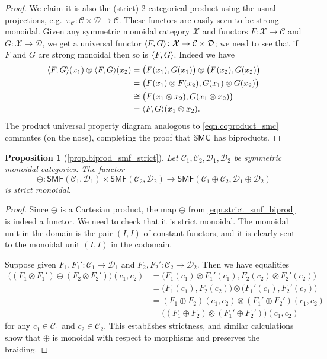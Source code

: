 \documentclass[11pt, oneside, article]{memoir}
\theoremstyle{plain}
\newtheorem*{proposition*}{Proposition}
\theoremstyle{definition}
\theoremstyle{remark}
\newcommand{\cat}[1]{\mathcal{#1}}%
\newcommand{\Cat}[1]{{\mathsf{#1}}}%
\newcommand{\CCat}[1]{\mathbb{\StrLeft{#1}{1}}\Cat{\StrGobbleLeft{#1}{1}}}%
\DeclarePairedDelimiter{\pair}{\langle}{\rangle}
\newcommand{\smf}{\Cat{SMF}}
\newcommand{\ssmc}{\CCat{SMC}}
\begin{document}
\begin{proof}
We claim it is also the (strict) 2-categorical product using the usual projections, e.g.\ $\pi_{\cat{C}}\colon\cat{C}\times\cat{D}\to\cat{C}$. These functors are easily seen to be strong monoidal. Given any symmetric monoidal category $\cat{X}$ and functors $F\colon\cat{X}\to\cat{C}$ and $G\colon\cat{X}\to\cat{D}$, we get a universal functor $\pair{F,G}\colon\cat{X}\to\cat{C}\times\cat{D}$; we need to see that if $F$ and $G$ are strong monoidal then so is $\pair{F,G}$. Indeed we have
\begin{align*}
	\pair{F,G}(x_1)\otimes\pair{F,G}(x_2)&=
	\big(F(x_1),G(x_1)\big)\otimes\big(F(x_2),G(x_2)\big)\\&=
	\big(F(x_1)\otimes F(x_2),G(x_1)\otimes G(x_2)\big)\\&\cong
	\big(F(x_1\otimes x_2),G(x_1\otimes x_2)\big)\\&=
	\pair{F,G}(x_1\otimes x_2).
\end{align*}
The product universal property diagram analogous to \cref{eqn.coproduct_smc} commutes (on the nose), completing the proof that $\ssmc$ has biproducts.
\end{proof}

\begin{proposition*}[\ref{prop.biprod_smf_strict}]\label{page.biprod_smf_strict}
Let $\cat{C}_1,\cat{C}_2,\cat{D}_1,\cat{D}_2$ be symmetric monoidal categories. The functor
\begin{equation}\label{eqn.strict_smf_biprod}\oplus\colon\smf(\cat{C}_1,\cat{D}_1)\times\smf(\cat{C}_2,\cat{D}_2)\to\smf(\cat{C}_1\oplus\cat{C}_2,\cat{D}_1\oplus\cat{D}_2)
\end{equation}
is strict monoidal.
\end{proposition*}
\begin{proof}
Since $\oplus$ is a Cartesian product, the map $\oplus$ from \cref{eqn.strict_smf_biprod} is indeed a functor. We need to check that it is strict monoidal. The monoidal unit in the domain is the pair $(I,I)$ of constant functors, and it is clearly sent to the monoidal unit $(I,I)$ in the codomain.

Suppose given $F_1, F_1'\colon\cat{C}_1\to\cat{D}_1$ and $F_2,F_2'\colon\cat{C}_2\to\cat{D}_2$. Then we have equalities
\begin{align*}
	\big((F_1\otimes F_1')\oplus(F_2\otimes F_2')\big)(c_1,c_2)&=
	\big(F_1(c_1)\otimes F_1'(c_1),F_2(c_2)\otimes F_2'(c_2)\big)\\&=
	\big(F_1(c_1),F_2(c_2)\big)\otimes\big(F_1'(c_1),F_2'(c_2)\big)\\&=
	(F_1\oplus F_2)(c_1,c_2)\otimes(F_1'\oplus F_2')(c_1,c_2)\\&=
	\big((F_1\oplus F_2)\otimes(F_1'\oplus F_2')\big)(c_1,c_2)
\end{align*}
for any $c_1\in\cat{C}_1$ and $c_2\in\cat{C}_2$. This establishes strictness, and similar calculations show that $\oplus$ is monoidal with respect to morphisms and preserves the braiding. 
\end{proof}
\end{document}
